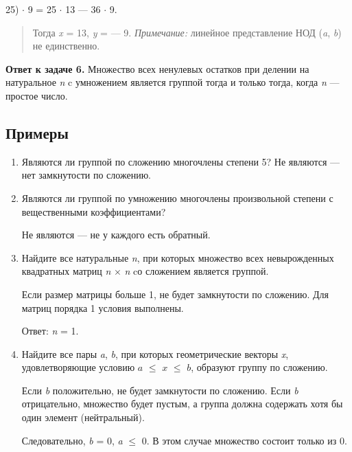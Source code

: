 \documentclass[12pt]{article}
\begin{document}
    25) $\cdot$ 9 = 25 $\cdot$ 13 --- 36 $\cdot$ 9.

    \begin{quote}
        Тогда \emph{x} = 13, \emph{y} = --- 9. \emph{Примечание:} линейное
        представление НОД (\emph{a}, \emph{b}) не единственно.
    \end{quote}

    \textbf{Ответ к задаче 6.} Множество всех ненулевых остатков при делении
    на натуральное \emph{n} c умножением является группой тогда и только
    тогда, когда \emph{n} --- простое число.

    \subsection{Примеры}

    \begin{enumerate}
        \def\labelenumi{\arabic{enumi}.}
        \item
              Являются ли группой по сложению многочлены степени 5? Не являются ---
              нет замкнутости по сложению.
        \item
              Являются ли группой по умножению многочлены произвольной степени с
              вещественными коэффициентами?

              Не являются --- не у каждого есть обратный.

        \item
              Найдите все натуральные \emph{n}, при которых множество всех
              невырожденных квадратных матриц \emph{n} $\times$ \emph{n} cо сложением
              является группой.

              Если размер матрицы больше 1, не будет замкнутости по сложению. Для
              матриц порядка 1 условия выполнены.

              Ответ: \emph{n} = 1.

        \item
              Найдите все пары \emph{a}, \emph{b}, при которых геометрические
              векторы \emph{x}, удовлетворяющие условию $a$ $\leq$ $x$ $\leq$ $b$, образуют группу
              по сложению.

              Если \emph{b} положительно, не будет замкнутости по сложению. Если
              \emph{b} отрицательно, множество будет пустым, а группа должна содержать
              хотя бы один элемент (нейтральный).

              Следовательно, \emph{b} = 0, \emph{a} $\leq$ 0. В этом случае множество
              состоит только из 0.


\end{enumerate}
\end{document}
